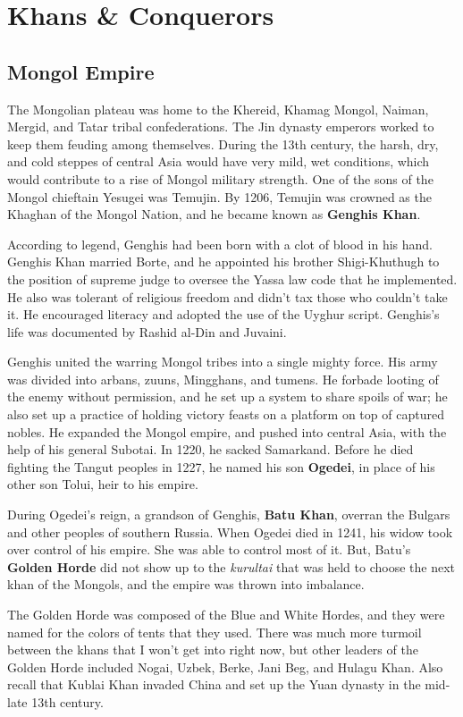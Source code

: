 \section{Khans \& Conquerors}

\subsection*{Mongol Empire}

The Mongolian plateau was home to the Khereid, Khamag Mongol, Naiman, Mergid, and Tatar tribal confederations.
The Jin dynasty emperors worked to keep them feuding among themselves.
During the 13th century, the harsh, dry, and cold steppes of central Asia would have very mild, wet conditions,
which would contribute to a rise of Mongol military strength.
One of the sons of the Mongol chieftain Yesugei was Temujin.
By 1206, Temujin was crowned as the Khaghan of the Mongol Nation,
and he became known as \textbf{Genghis Khan}.

According to legend, Genghis had been born with a clot of blood in his hand.
Genghis Khan married Borte,
and he appointed his brother Shigi-Khuthugh to the position of supreme judge
to oversee the Yassa law code that he implemented.
He also was tolerant of religious freedom and didn't tax those who couldn't take it.
He encouraged literacy and adopted the use of the Uyghur script.
Genghis's life was documented by Rashid al-Din and Juvaini.

Genghis united the warring Mongol tribes into a single mighty force.
His army was divided into arbans, zuuns, Mingghans, and tumens.
He forbade looting of the enemy without permission, and he set up a system to share spoils of war;
he also set up a practice of holding victory feasts on a platform on top of captured nobles.
He expanded the Mongol empire, and pushed into central Asia, with the help of his general Subotai.
In 1220, he sacked Samarkand.
Before he died fighting the Tangut peoples in 1227,
he named his son \textbf{Ogedei}, in place of his other son Tolui, heir to his empire.

During Ogedei's reign, a grandson of Genghis, \textbf{Batu Khan},
overran the Bulgars and other peoples of southern Russia.
When Ogedei died in 1241, his widow took over control of his empire.
She was able to control most of it.
But, Batu's \textbf{Golden Horde} did not show up to the
\textit{kurultai} that was held to choose the next khan of the Mongols,
and the empire was thrown into imbalance.

The Golden Horde was composed of the Blue and White Hordes,
and they were named for the colors of tents that they used.
There was much more turmoil between the khans that I won't get into right now,
but other leaders of the Golden Horde included Nogai, Uzbek, Berke, Jani Beg, and Hulagu Khan.
Also recall that Kublai Khan invaded China and set up the Yuan dynasty in the mid-late 13th century.

